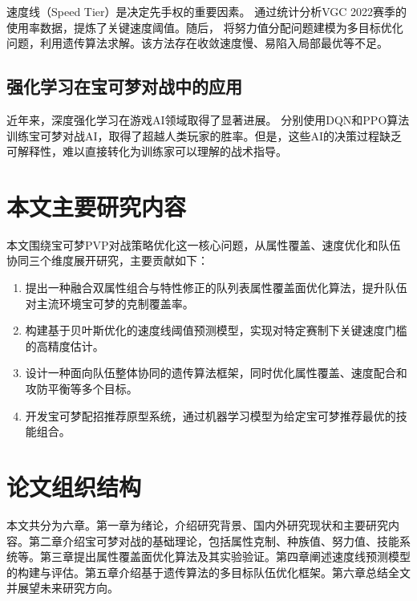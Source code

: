 速度线（Speed Tier）是决定先手权的重要因素。\citet{betts2005aging} 通过统计分析VGC 2022赛季的使用率数据，提炼了关键速度阈值。随后，\citet{chu2004tushu} 将努力值分配问题建模为多目标优化问题，利用遗传算法求解。该方法存在收敛速度慢、易陷入局部最优等不足。

\subsection{强化学习在宝可梦对战中的应用}

近年来，深度强化学习在游戏AI领域取得了显著进展。\citet{walls2013drought, hls2012jinji} 分别使用DQN和PPO算法训练宝可梦对战AI，取得了超越人类玩家的胜率。但是，这些AI的决策过程缺乏可解释性，难以直接转化为训练家可以理解的战术指导。

\section{本文主要研究内容}

本文围绕宝可梦PVP对战策略优化这一核心问题，从属性覆盖、速度优化和队伍协同三个维度展开研究，主要贡献如下：

\begin{enumerate}
    \item 提出一种融合双属性组合与特性修正的队列表属性覆盖面优化算法，提升队伍对主流环境宝可梦的克制覆盖率。
    \item 构建基于贝叶斯优化的速度线阈值预测模型，实现对特定赛制下关键速度门槛的高精度估计。
    \item 设计一种面向队伍整体协同的遗传算法框架，同时优化属性覆盖、速度配合和攻防平衡等多个目标。
    \item 开发宝可梦配招推荐原型系统，通过机器学习模型为给定宝可梦推荐最优的技能组合。
\end{enumerate}

\section{论文组织结构}

本文共分为六章。第一章为绪论，介绍研究背景、国内外研究现状和主要研究内容。第二章介绍宝可梦对战的基础理论，包括属性克制、种族值、努力值、技能系统等。第三章提出属性覆盖面优化算法及其实验验证。第四章阐述速度线预测模型的构建与评估。第五章介绍基于遗传算法的多目标队伍优化框架。第六章总结全文并展望未来研究方向。
